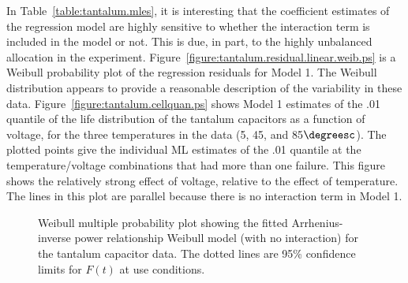 In Table~\ref{table:tantalum.mles}, it is interesting that the
coefficient estimates of the regression model are highly sensitive
to whether the interaction term is included in the model or
not. This is due, in part, to the highly unbalanced allocation in
the experiment.
Figure~\ref{figure:tantalum.residual.linear.weib.ps} is a Weibull
probability plot of the regression residuals for Model 1.  The
Weibull distribution appears to provide a reasonable description of
the variability in these data.
Figure~\ref{figure:tantalum.cellquan.ps} shows Model 1 estimates of
the .01 quantile of the life distribution of the tantalum capacitors
as a function of voltage, for the three temperatures in the data (5,
45, and 85$\degreesc$).  The plotted points give the individual ML
estimates of the .01 quantile at the temperature/voltage
combinations that had more than one failure. This figure shows the
relatively strong effect of voltage, relative to the effect of
temperature. The lines in this plot are parallel because there is no
interaction term in Model 1.
\begin{figure}
\caption{Weibull multiple probability plot showing the fitted
Arrhenius-inverse power relationship Weibull model (with no interaction) for
the tantalum capacitor data. The dotted lines
are 95\% confidence limits for $F(t)$ at use conditions.}
\label{figure:tantalum.groupm.ps}
\end{figure}

